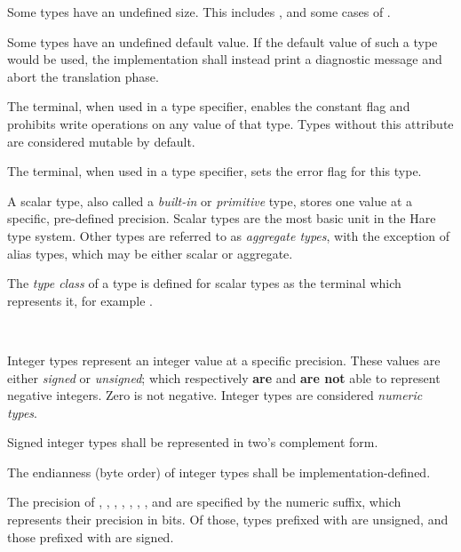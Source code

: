 \specsubitem
Some types have an undefined size. This includes ,
and some cases of .

\specsubitem
Some types have an undefined default value. If the default value of such a type
would be used, the implementation shall instead print a diagnostic message and
abort the translation phase.

\specsubitem
The  terminal, when used in a type specifier, enables the
constant flag and prohibits write operations on any value of that type. Types
without this attribute are considered mutable by default.

\specsubitem
The \terminal{!} terminal, when used in a type specifier, sets the
error flag for this type.

\specsubitem
A scalar type, also called a \textit{built-in} or \textit{primitive} type,
stores one value at a specific, pre-defined precision. Scalar types are the
most basic unit in the Hare type system. Other types are referred to as
\textit{aggregate types}, with the exception of alias types, which may be
either scalar or aggregate.

\specsubitem
The \textit{type class} of a type is defined for scalar types as the terminal
which represents it, for example .


\begin{grammar}
\oneof \\
\end{grammar}

\specsubsubitem
Integer types represent an integer value at a specific precision. These values
are either \textit{signed} or \textit{unsigned}; which respectively
\textbf{are} and \textbf{are not} able to represent negative integers. Zero is
not negative. Integer types are considered \textit{numeric types}.

\specsubsubitem
Signed integer types shall be represented in two's complement form.

\specsubsubitem
The endianness (byte order) of integer types shall be implementation-defined.

\specsubsubitem
The precision of , , ,
, , , , and
 are specified by the numeric suffix, which represents their
precision in bits. Of those, types prefixed with  are unsigned, and
those prefixed with  are signed.


